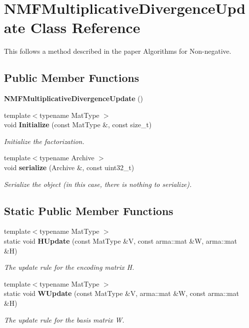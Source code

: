 \section{N\+M\+F\+Multiplicative\+Divergence\+Update Class Reference}
\label{classmlpack_1_1amf_1_1NMFMultiplicativeDivergenceUpdate}


This follows a method described in the paper \textquotesingle{}Algorithms for Non-\/negative.  


\subsection*{Public Member Functions}
\begin{DoxyCompactItemize}
\item 
\textbf{ N\+M\+F\+Multiplicative\+Divergence\+Update} ()
\item 
{\footnotesize template$<$typename Mat\+Type $>$ }\\void \textbf{ Initialize} (const Mat\+Type \&, const size\+\_\+t)
\begin{DoxyCompactList}\small\item\em Initialize the factorization. \end{DoxyCompactList}\item 
{\footnotesize template$<$typename Archive $>$ }\\void \textbf{ serialize} (Archive \&, const uint32\+\_\+t)
\begin{DoxyCompactList}\small\item\em Serialize the object (in this case, there is nothing to serialize). \end{DoxyCompactList}\end{DoxyCompactItemize}
\subsection*{Static Public Member Functions}
\begin{DoxyCompactItemize}
\item 
{\footnotesize template$<$typename Mat\+Type $>$ }\\static void \textbf{ H\+Update} (const Mat\+Type \&V, const arma\+::mat \&W, arma\+::mat \&H)
\begin{DoxyCompactList}\small\item\em The update rule for the encoding matrix H. \end{DoxyCompactList}\item 
{\footnotesize template$<$typename Mat\+Type $>$ }\\static void \textbf{ W\+Update} (const Mat\+Type \&V, arma\+::mat \&W, const arma\+::mat \&H)
\begin{DoxyCompactList}\small\item\em The update rule for the basis matrix W. \end{DoxyCompactList}\end{DoxyCompactItemize}


